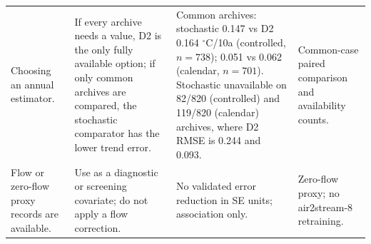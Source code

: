 \begin{table}[p]
{\begin{tabular}{@{}>{\raggedright\arraybackslash}p{}>{\raggedright\arraybackslash}p{}>{\raggedright\arraybackslash}p{}>{\raggedright\arraybackslash}p{}@{}}
Choosing an annual estimator. & If every archive needs a value, D2 is the only fully available option; if only common archives are compared, the stochastic comparator has the lower trend error. & Common archives: stochastic 0.147 vs D2 0.164 $^{\circ}$C/10a (controlled, $n{=}738$); 0.051 vs 0.062 (calendar, $n{=}701$). Stochastic unavailable on 82/820 (controlled) and 119/820 (calendar) archives, where D2 RMSE is 0.244 and 0.093. & Common-case paired comparison and availability counts. \\
Flow or zero-flow proxy records are available. & Use as a diagnostic or screening covariate; do not apply a flow correction. & No validated error reduction in SE units; association only. & Zero-flow proxy; no air2stream-8 retraining. \\
\bottomrule
\end{tabular}}
\end{table}
